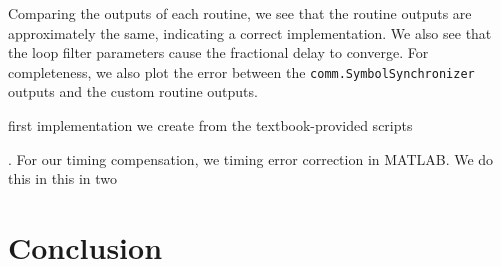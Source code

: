 \documentclass{article}
\begin{document}
\noindent Comparing the outputs of each routine, we see that the routine outputs are approximately the same, indicating a correct implementation. We also see that the loop filter parameters cause the fractional delay to converge. For completeness, we also plot the error between the \texttt{comm.SymbolSynchronizer} outputs and the custom routine outputs. 

  first implementation we create from the textbook-provided scripts

. For our timing compensation, we  timing error correction in MATLAB. We do this in this in two 
\section{Conclusion}
	
\end{document}
